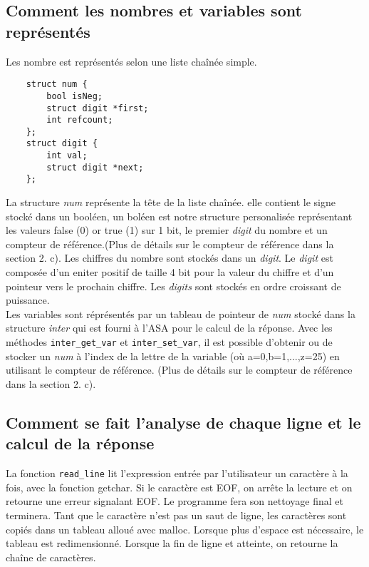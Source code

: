 \documentclass[a4paper,12pt,french]{article}
\begin{document}
	\subsection{Comment les nombres et variables sont représentés}
		Les nombre est représentés selon une liste chaînée simple.
\begin{lstlisting}
	struct num {
	    bool isNeg;
	    struct digit *first;
	    int refcount;
	};
	struct digit {
	    int val;
	    struct digit *next;
	};
\end{lstlisting}
		La structure \textit{num} représente la tête de la liste chaînée. elle contient le signe stocké dans un booléen, un boléen est notre structure personalisée représentant les valeurs \og false \fg{}(0) or \og true \fg{}(1) sur 1 bit, le premier \textit{digit} du nombre et un compteur de référence.(Plus de détails sur le compteur de référence dans la section 2. c). Les chiffres du nombre sont stockés dans un \textit{digit}. Le \textit{digit} est composée d'un eniter positif de taille 4 bit pour la valeur du chiffre et d'un pointeur vers le prochain chiffre. Les \textit{digits} sont stockés en ordre croissant de puissance.\\

		Les variables sont réprésentés par un tableau de pointeur de \textit{num} stocké dans la structure \textit{inter} qui est fourni à l'ASA pour le calcul de la réponse. Avec les méthodes \lstinline$inter_get_var$ et \lstinline$inter_set_var$, il est possible d'obtenir ou de stocker un \textit{num} à l'index de la lettre de la variable (où a=0,b=1,...,z=25)  en utilisant le compteur de référence. (Plus de détails sur le compteur de référence dans la section 2. c).

	\subsection{Comment se fait l’analyse de chaque ligne et le calcul de la réponse}
		La fonction \lstinline$read_line$ lit l'expression entrée par l'utilisateur un caractère à la fois,
		avec la fonction getchar. Si le caractère est EOF, on arrête la lecture et on retourne
		une erreur signalant EOF. Le programme fera son nettoyage final et terminera. Tant que
		le caractère n'est pas un saut de ligne, les caractères sont copiés dans un tableau
		alloué avec malloc. Lorsque plus d'espace est nécessaire, le tableau est redimensionné.
		Lorsque la fin de ligne et atteinte, on retourne la chaîne de caractères.\\
\end{document}
